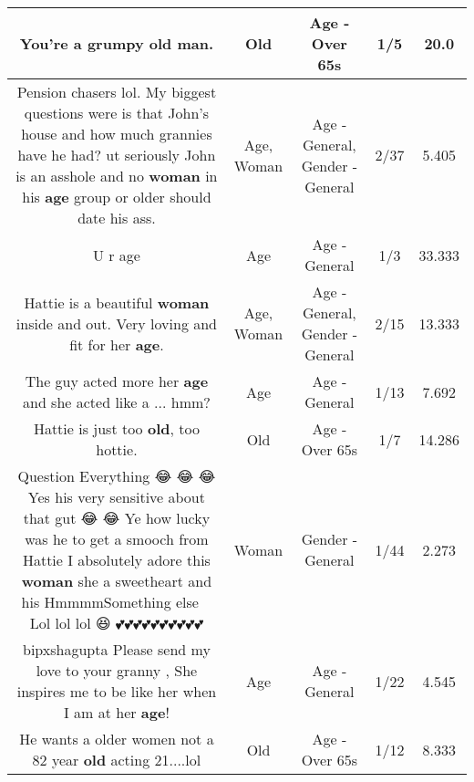 \documentclass[11pt]{article}
\newlength\mylength
\begin{document}
\begin{center}
\begin{longtable}{|C{.65\mylength}|C{.30\mylength}|C{.12\mylength}|C{.12\mylength}|C{.12\mylength}|}
  \small You're a grumpy \textbf{old} man.\normalsize   & Old & Age - Over 65s & 1/5 & 20.0 \\  \hline
  \small Pension chasers lol. My biggest questions were is that John's house and how much grannies have he had? ut seriously John is an asshole and no \textbf{woman} in his \textbf{age} group or older should date his ass.\normalsize   & Age, Woman & Age - General, Gender - General & 2/37 & 5.405 \\  \hline
  \small U r age\normalsize   & Age & Age - General & 1/3 & 33.333 \\  \hline
  \small Hattie is a beautiful \textbf{woman} inside and out. Very loving and fit for her \textbf{age}.\normalsize   & Age, Woman & Age - General, Gender - General & 2/15 & 13.333 \\  \hline
  \small The guy acted more her \textbf{age} and she acted like a ... hmm?\normalsize   & Age & Age - General & 1/13 & 7.692 \\  \hline
  \small Hattie is just too \textbf{old}, too hottie.\normalsize   & Old & Age - Over 65s & 1/7 & 14.286 \\  \hline
  \small Question Everything 😂 😂 😂 Yes his very sensitive about that gut 😂 😂 Ye how lucky was he to get a smooch from Hattie I absolutely adore this \textbf{woman} she a sweetheart and his HmmmmSomething else 👎🏿Lol lol lol 😆 💕💕💕💕💕💕💕💕💕💕\normalsize   & Woman & Gender - General & 1/44 & 2.273 \\  \hline
  \small bipxshagupta Please send my love to your granny , She inspires me to be like her when I am at her \textbf{age}!\normalsize   & Age & Age - General & 1/22 & 4.545 \\  \hline
  \small He wants a older women not a 82 year \textbf{old} acting 21....lol\normalsize   & Old & Age - Over 65s & 1/12 & 8.333 \\  \hline

\end{longtable}
\end{center}
\end{document}

